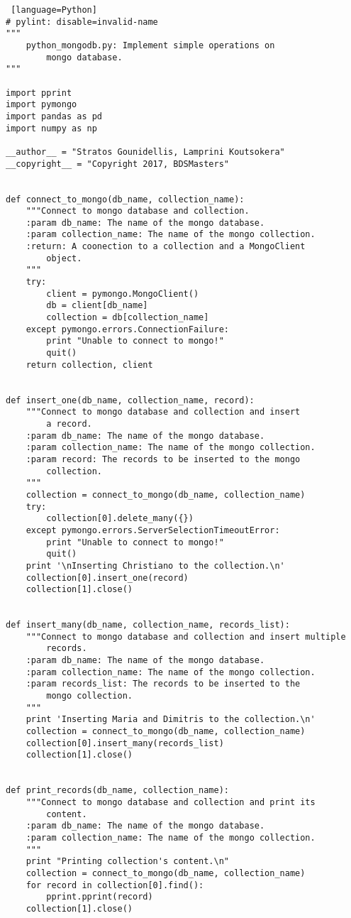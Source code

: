 \documentclass[11pt]{article}
\begin{document}
\begin{lstlisting} [language=Python]
# pylint: disable=invalid-name
"""
    python_mongodb.py: Implement simple operations on
        mongo database.
"""

import pprint
import pymongo
import pandas as pd
import numpy as np

__author__ = "Stratos Gounidellis, Lamprini Koutsokera"
__copyright__ = "Copyright 2017, BDSMasters"


def connect_to_mongo(db_name, collection_name):
    """Connect to mongo database and collection.
    :param db_name: The name of the mongo database.
    :param collection_name: The name of the mongo collection.
    :return: A coonection to a collection and a MongoClient
        object.
    """
    try:
        client = pymongo.MongoClient()
        db = client[db_name]
        collection = db[collection_name]
    except pymongo.errors.ConnectionFailure:
        print "Unable to connect to mongo!"
        quit()
    return collection, client


def insert_one(db_name, collection_name, record):
    """Connect to mongo database and collection and insert
        a record.
    :param db_name: The name of the mongo database.
    :param collection_name: The name of the mongo collection.
    :param record: The records to be inserted to the mongo
        collection.
    """
    collection = connect_to_mongo(db_name, collection_name)
    try:
        collection[0].delete_many({})
    except pymongo.errors.ServerSelectionTimeoutError:
        print "Unable to connect to mongo!"
        quit()
    print '\nInserting Christiano to the collection.\n'
    collection[0].insert_one(record)
    collection[1].close()


def insert_many(db_name, collection_name, records_list):
    """Connect to mongo database and collection and insert multiple
        records.
    :param db_name: The name of the mongo database.
    :param collection_name: The name of the mongo collection.
    :param records_list: The records to be inserted to the
        mongo collection.
    """
    print 'Inserting Maria and Dimitris to the collection.\n'
    collection = connect_to_mongo(db_name, collection_name)
    collection[0].insert_many(records_list)
    collection[1].close()


def print_records(db_name, collection_name):
    """Connect to mongo database and collection and print its
        content.
    :param db_name: The name of the mongo database.
    :param collection_name: The name of the mongo collection.
    """
    print "Printing collection's content.\n"
    collection = connect_to_mongo(db_name, collection_name)
    for record in collection[0].find():
        pprint.pprint(record)
    collection[1].close()



\end{lstlisting}
\end{document}
